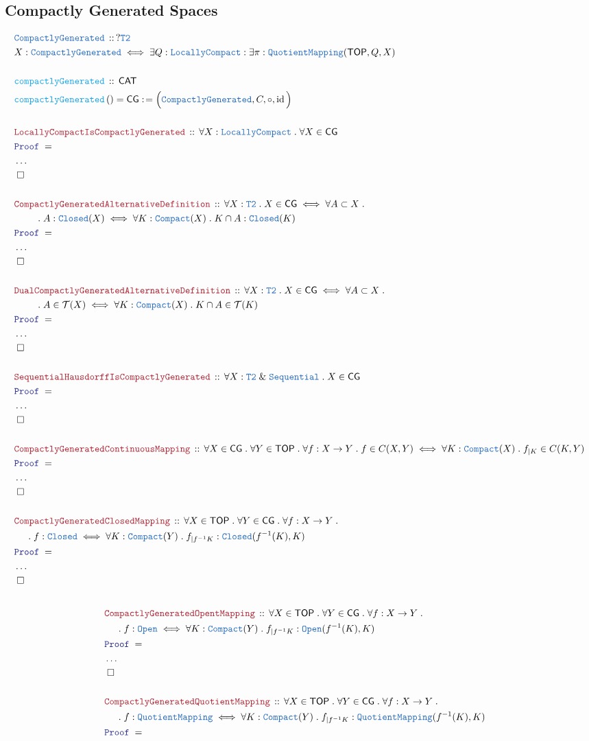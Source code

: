 \documentclass[12pt]{scrartcl}
\newcommand{\TYPE}[1]{\textcolor{NavyBlue}{\mathtt{#1}}}
\newcommand{\FUNC}[1]{\textcolor{Cerulean}{\mathtt{#1}}}
\newcommand{\LOGIC}[1]{\textcolor{Blue}{\mathtt{#1}}}
\newcommand{\THM}[1]{\textcolor{Maroon}{\mathtt{#1}}}
\renewcommand{\.}{\; . \;}
\newcommand{\de}{: \kern 0.1pc =}
\newcommand{\Act}[1]{\left( #1 \right)}
\newcommand{\Theorem}[2]{& \THM{#1} \, :: \, #2 \\ & \Proof = \\ }
\newcommand{\DeclareType}[2]{& \TYPE{#1} \, :: \, #2 \\}
\newcommand{\DefineType}[3]{& #1 : \TYPE{#2} \iff #3 \\}
\newcommand{\DeclareFunc}[2]{& \FUNC{#1} \, :: \, #2 \\}
\newcommand{\DefineNamedFunc}[4]{&  \FUNC{#1}\Act{#2} = #3 \de #4 \\}
\newcommand{\NewLine}{\\ & \kern 1pc}
\newcommand{\Page}[1]{ \begin{align*} #1 \end{align*}   }
\newcommand{\NoProof}{ & \ldots \\ \EndProof}
\renewcommand{\And}{\; \& \;}
\DeclareMathOperator*{\id}{id}
\newcommand{\QED}{\; \square}
\newcommand{\EndProof}{& \QED \\}
\newcommand{\Proof}{\LOGIC{Proof} \; }
\newcommand{\CAT}{\mathsf{CAT}}
\newcommand{\TOP}{\mathsf{TOP}}
\newcommand{\CG}{\mathsf{CG}}
\newcommand{\T}{\mathcal{T}}
\begin{document}
\subsection{Compactly Generated Spaces}
\Page{
	\DeclareType{CompactlyGenerated}{?\TYPE{T2}}
	\DefineType{X}{CompactlyGenerated}{\exists Q : \TYPE{LocallyCompact} : \exists \pi : \TYPE{QuotientMapping}(\TOP,Q,X)}
	\\
	\DeclareFunc{compactlyGenerated}{\CAT}
	\DefineNamedFunc{compactlyGenerated}{}{\CG}{\Big( \TYPE{CompactlyGenerated}, C, \circ, \id \Big)}
	\\
	\Theorem{LocallyCompactIsCompactlyGenerated}
	{
		\forall X : \TYPE{LocallyCompact} \.
		\forall X \in \CG
	}
	\NoProof
	\\
	\Theorem{CompactlyGeneratedAlternativeDefinition}
	{
		\forall X : \TYPE{T2} \.
		X \in \CG 
		\iff
		\forall A \subset X \. \NewLine \quad \. 
			A : \TYPE{Closed}(X) 
			\iff 
			\forall K : \TYPE{Compact}(X) \.
			K \cap A : \TYPE{Closed}(K)
	}
	\NoProof
	\\
	\Theorem{DualCompactlyGeneratedAlternativeDefinition}
	{
		\forall X : \TYPE{T2} \.
		X \in \CG 
		\iff
		\forall A \subset X \. \NewLine \quad \. 
			A  \in \T(X) 
			\iff 
			\forall K : \TYPE{Compact}(X) \.
			K \cap A \in \T(K)
	}
	\NoProof
	\\
	\Theorem{SequentialHausdorffIsCompactlyGenerated}
	{
		\forall X : \TYPE{T2} \And \TYPE{Sequential} \.
		X \in \CG	
	}
	\NoProof
	\\
	\Theorem{CompactlyGeneratedContinuousMapping}
	{
		\forall X \in \CG \.
		\forall Y \in \TOP \.
		\forall f : X \to Y \.
		f \in C(X,Y) \iff
		\forall K : \TYPE{Compact}(X) \. 
		f_{|K} \in C(K,Y)
	}
	\NoProof
	\\
	\Theorem{CompactlyGeneratedClosedMapping}
	{
		\forall X \in \TOP \.
		\forall Y \in \CG \.
		\forall f : X \to Y \. \NewLine \.
		f : \TYPE{Closed} \iff
		\forall K : \TYPE{Compact}(Y) \. 
		f_{|f^{-1}K} : \TYPE{Closed}(f^{-1}(K),K) 
	}
	\NoProof
}\Page{
	\\
	\Theorem{CompactlyGeneratedOpentMapping}
	{
		\forall X \in \TOP \.
		\forall Y \in \CG \.
		\forall f : X \to Y \. \NewLine \.
		f : \TYPE{Open} \iff
		\forall K : \TYPE{Compact}(Y) \. 
		f_{|f^{-1}K} : \TYPE{Open}(f^{-1}(K),K) 
	}
	\NoProof
	\\
	\Theorem{CompactlyGeneratedQuotientMapping}
	{
		\forall X \in \TOP \.
		\forall Y \in \CG \.
		\forall f : X \to Y \. \NewLine \.
		f : \TYPE{QuotientMapping} \iff
		\forall K : \TYPE{Compact}(Y) \. 
		f_{|f^{-1}K} : \TYPE{QuotientMapping}(f^{-1}(K),K) 
}}
\end{document}
